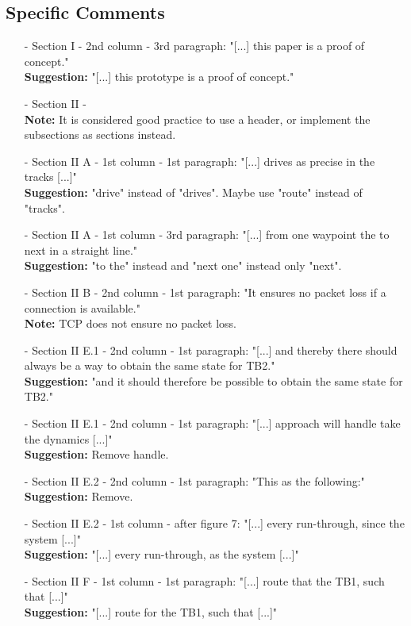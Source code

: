 \subsection{Specific Comments}
\begin{itemize}
  \item[-] Section I - 2nd column - 3rd paragraph: "[...] this paper is a proof of concept."\\
  \textbf{Suggestion:} "[...] this prototype is a proof of concept."

  \item[-] Section II - \\
	\textbf{Note:} It is considered good practice to use a header, or implement the subsections as sections instead.

  \item[-] Section II A - 1st column - 1st paragraph: "[...] drives as precise in the tracks [...]"\\
  \textbf{Suggestion:} "drive" instead of "drives". Maybe use "route" instead of "tracks".

  \item[-] Section II A - 1st column - 3rd paragraph: "[...] from one waypoint the to next in a straight line."\\
	\textbf{Suggestion:} "to the" instead and "next one" instead only "next".

	\item[-] Section II B - 2nd column - 1st paragraph: "It ensures no packet loss if a connection is available."\\
	\textbf{Note:} TCP does not ensure no packet loss. 

	\item[-] Section II E.1 - 2nd column - 1st paragraph: "[...] and thereby there should always be a way to obtain the same state for TB2."\\
	\textbf{Suggestion:} "and it should therefore be possible to obtain the same state for TB2."

	\item[-] Section II E.1 - 2nd column - 1st paragraph: "[...] approach will handle take the dynamics [...]"\\
	\textbf{Suggestion:} Remove handle.

	\item[-] Section II E.2 - 2nd column - 1st paragraph: "This as the following:"\\
	\textbf{Suggestion:} Remove.

	\item[-] Section II E.2 - 1st column - after figure 7: "[...] every run-through, since the system [...]"\\
	\textbf{Suggestion:} "[...] every run-through, as the system [...]"

	\item[-] Section II F - 1st column - 1st paragraph: "[...] route that the TB1, such that [...]"\\
	\textbf{Suggestion:} "[...] route for the TB1, such that [...]"
\end{itemize}

